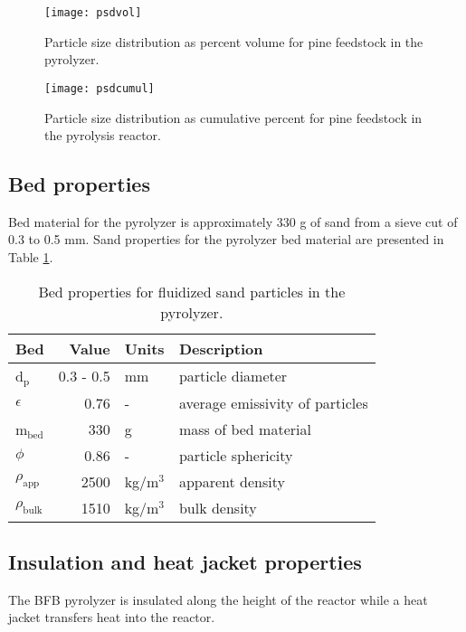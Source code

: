 \begin{figure}[H]
    \centering
    \texttt{[image: psdvol]}
    \caption{Particle size distribution as percent volume for pine feedstock in the pyrolyzer.}
    \label{fig:psdvol}
\end{figure}

\begin{figure}[H]
    \centering
    \texttt{[image: psdcumul]}
    \caption{Particle size distribution as cumulative percent for pine feedstock in the pyrolysis reactor.}
    \label{fig:psdcumul}
\end{figure}

\subsection{Bed properties}

Bed material for the pyrolyzer is approximately 330 g of sand from a sieve cut of 0.3 to 0.5 mm. Sand properties for the pyrolyzer bed material are presented in Table \ref{tab:sand-properties}.

\begin{table}[H]
    \centering
    \caption{Bed properties for fluidized sand particles in the pyrolyzer.}
    \label{tab:sand-properties}
    \begin{tabular}{lrll}
        \toprule
        Bed & Value & Units & Description \\
        \midrule
        d$_\textrm{p}$ & 0.3 - 0.5 & mm & particle diameter \\
        $\epsilon$ & 0.76 & - & average emissivity of particles \\
        m$_\textrm{bed}$ & 330 & g & mass of bed material \\
        $\phi$ & 0.86 & - & particle sphericity \\
        $\rho_\textrm{app}$ & 2500 & kg/m$^3$ & apparent density \\
        $\rho_\textrm{bulk}$ & 1510 & kg/m$^3$ & bulk density \\
        \bottomrule
    \end{tabular}
\end{table}

\subsection{Insulation and heat jacket properties}

The BFB pyrolyzer is insulated along the height of the reactor while a heat jacket transfers heat into the reactor.

